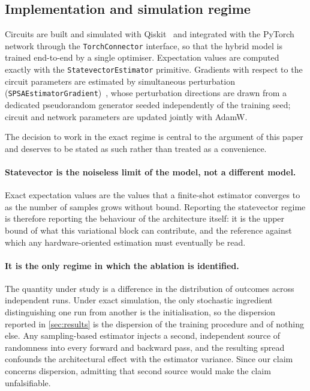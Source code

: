 \documentclass[aps,floatfix,superscriptaddress,twocolumn,tightenlines,amsmath,amssymb,nofootinbib,10pt,longbibliography,prl]{revtex4-2}
\begin{document}
\subsection{Implementation and simulation regime}
\label{subsec:implementation}

Circuits are built and simulated with Qiskit~\cite{qiskit2024} and integrated
with the PyTorch network through the \texttt{TorchConnector} interface, so that
the hybrid model is trained end-to-end by a single optimiser. Expectation values
are computed exactly with the \texttt{StatevectorEstimator} primitive. Gradients
with respect to the circuit parameters are estimated by simultaneous
perturbation (\texttt{SPSAEstimatorGradient})~\cite{spall1992}, whose
perturbation directions are drawn from a dedicated pseudorandom generator seeded
independently of the training seed; circuit and network parameters are updated
jointly with AdamW.

The decision to work in the exact regime is central to the argument of this
paper and deserves to be stated as such rather than treated as a convenience.

\paragraph{Statevector is the noiseless limit of the model, not a different
model.} Exact expectation values are the values that a finite-shot estimator
converges to as the number of samples grows without bound. Reporting the
statevector regime is therefore reporting the behaviour of the architecture
itself: it is the upper bound of what this variational block can contribute, and
the reference against which any hardware-oriented estimation must eventually be
read.

\paragraph{It is the only regime in which the ablation is identified.}
The quantity under study is a difference in the distribution of outcomes across
independent runs. Under exact simulation, the only stochastic ingredient
distinguishing one run from another is the initialisation, so the dispersion
reported in \ref{sec:results} is the dispersion of the training procedure and
of nothing else. Any sampling-based estimator injects a second, independent
source of randomness into every forward and backward pass, and the resulting
spread confounds the architectural effect with the estimator variance. Since our
claim concerns dispersion, admitting that second source would make the claim
unfalsifiable.
\end{document}
